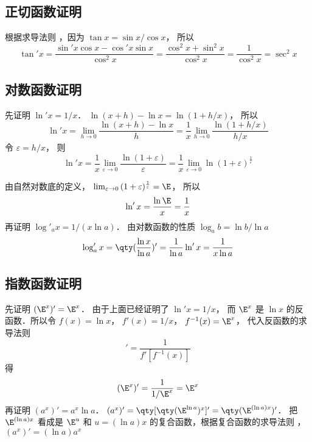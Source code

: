 \subsection{正切函数证明}
根据求导法则%
，因为 $\tan x = {{\sin x}}/{{\cos x}}$， 所以
\begin{equation}
\tan' x = \frac{\sin' x \cos x - \cos' x\sin x}{\cos^2 x} = \frac{\cos^2x + \sin^2 x}{\cos^2 x} = \frac{1}{\cos ^2 x} = \sec ^2 x
\end{equation}
\subsection{对数函数证明}
先证明 $\ln' x = {1}/{x}$．  $\ln(x + h) - \ln x = \ln(1 + h/x)$， 所以
 \begin{equation}
\ln 'x = \lim_{h \to 0} \frac{\ln(x + h) - \ln x}{h} = \frac{1}{x} \lim_{h \to 0} \frac{\ln(1 + h/x)}{h/x}
\end{equation}
令 $\varepsilon  = h/x$， 则
\begin{equation}
\ln' x = \frac{1}{x} \lim_{\varepsilon  \to 0} \frac{\ln(1 + \varepsilon)}{\varepsilon } = \frac{1}{x} \lim_{\varepsilon  \to 0} \ln(1 + \varepsilon)^{\frac{1}{\varepsilon }} 
\end{equation}
 
由自然对数底的定义， $\lim_{\varepsilon  \to 0} {(1 + \varepsilon)^{\frac{1}{\varepsilon }}} = \E$， 所以
 \begin{equation}
\ln 'x = \frac{\ln \E}{x} = \frac{1}{x}
\end{equation}
再证明 ${\log'_a}x = {1}/{(x\ln a)}$． 
由对数函数的性质 ${\log _a}b = {{\ln b}}/{{\ln a}}$
\begin{equation}
\log'_a x = \qty( {\frac{\ln x}{\ln a}} )' = \frac{1}{\ln a}\ln' x = \frac{1}{x\ln a}
\end{equation}

\subsection{指数函数证明}
先证明 $(\E^x)' = \E^x$． 
由于上面已经证明了 $ \ln'x = 1/x$， 而 $\E^x$ 是 $\ln x$ 的反函数．所以令 $f(x) = \ln x$， $f'(x) = 1/x$，  $f^{ - 1} (x) = \E^x$， 代入反函数的求导法则%
\begin{equation}
[f^{-1} (x)]' = \frac{1}{f'[f^{ - 1}(x)]}
\end{equation} 
得
\begin{equation}
(\E^x)' = \frac{1}{1/\E^x} = \E^x
\end{equation}
再证明 $(a^x)' = a^x \ln a$．  $(a^x)' = \qty[ \qty( \E^{\ln a} )^x ]' = \qty( \E^{(\ln a) x} )'$． 把 $\E^{(\ln a) x}$ 看成是 $\E^u$ 和 $u = (\ln a) x$ 的复合函数，根据复合函数的求导法则 ，$(a^x)' = (\ln a) a^x$ 



















